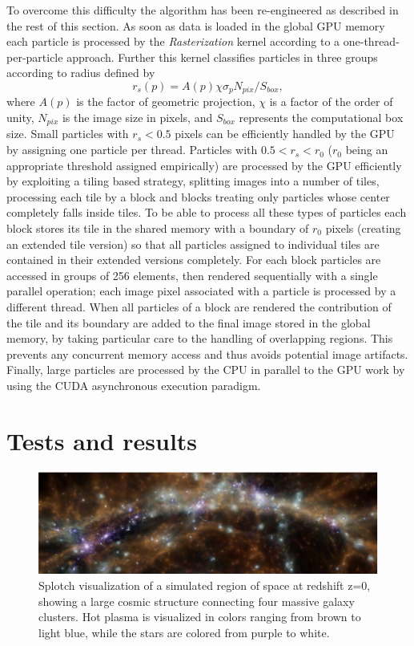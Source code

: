 To overcome this difficulty the algorithm has been re-engineered
as described in the rest of this section. As soon as data is loaded in the global GPU memory each particle is processed by the {\it Rasterization} kernel according to a one-thread-per-particle approach. Further this kernel classifies 
particles in three groups according to radius defined by
\begin{equation}\label{rad2}{r_s(p)}=A(p)\chi \sigma_p N_{pix}/ S_{box},
\end{equation}
where $A(p)$ is the factor of geometric projection, $\chi$ is a factor of the order of unity, $N_{pix}$ is the image size in pixels, and $S_{box}$ represents the computational box size. Small particles with $r_s < 0.5$ pixels can be efficiently handled by the GPU by assigning one particle per thread. Particles with $0.5<r_s<r_0$ ($r_0$ being an appropriate threshold assigned empirically) are processed by the GPU efficiently by exploiting a tiling based strategy, splitting images into a number of tiles, processing each tile by a block and blocks treating only particles whose center completely falls inside tiles. To be able to process all these types of particles each block stores its tile in the shared memory with a boundary of $r_0$ pixels (creating an extended tile version) so that all particles assigned to individual tiles are contained in their extended versions completely. For each block particles are accessed in groups of 256 elements, then rendered sequentially with a single parallel operation; each image pixel associated with a particle is processed by a different thread. When all particles of a block are rendered the contribution of the tile and its boundary are added to the final image stored in the global memory, by taking particular care to the handling of overlapping regions. This prevents any concurrent memory access and thus avoids potential image artifacts. Finally, large particles are processed by the CPU in parallel 
to the GPU work by using the CUDA asynchronous execution paradigm.

\section{Tests and results}

\begin{figure}
\centering
\includegraphics[scale=1.0]{part4/Gheller_P013/P013-1.eps}
\caption{Splotch visualization of a simulated region of space at redshift z=0, 
showing a large cosmic structure connecting four massive galaxy clusters. 
Hot plasma is visualized in colors ranging from brown to light blue, 
while the stars are colored from purple to white. 
}

\label{fig:box}
\end{figure}


